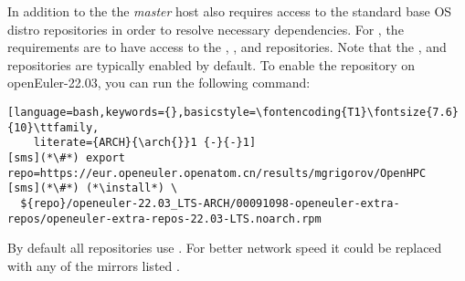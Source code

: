In addition to the \OHPC{} 
\iftoggle{isxCAT}{and \xCAT{} package repositories,}{package repository,}
the {\em master} host also requires access to the standard base OS distro
repositories in order to resolve necessary dependencies. For \baseOS{}, the
requirements are to have access to the {\color{purple}{OS}},
{\color{purple}{Everything}}, {\color{purple}{EPOL main}} and
{\color{purple}{EPOL update}} repositories.  Note that the
{\color{purple}{OS}}, {\color{purple}{Everything}} and {\color{purple}{EPOL
main}} repositories are typically enabled by default.  To enable the 
{\color{purple}{EPOL update}} repository on openEuler-22.03, you can run the following
command:

\begin{lstlisting}[language=bash,keywords={},basicstyle=\fontencoding{T1}\fontsize{7.6}{10}\ttfamily,
	literate={ARCH}{\arch{}}1 {-}{-}1]
[sms](*\#*) export repo=https://eur.openeuler.openatom.cn/results/mgrigorov/OpenHPC
[sms](*\#*) (*\install*) \
  ${repo}/openeuler-22.03_LTS-ARCH/00091098-openeuler-extra-repos/openeuler-extra-repos-22.03-LTS.noarch.rpm
\end{lstlisting}


By default all repositories use {\color{blue}{http://repo.openeuler.org}}. 
For better network speed it could be replaced with any of the mirrors listed
\href{https://www.openeuler.org/en/mirror/list/}{\color{blue}{here}}.
